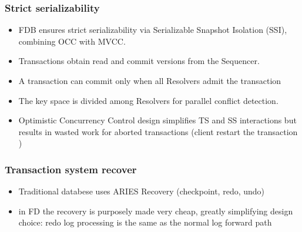 

\begin{frame}
	\frametitle{Strict serializability}
\begin{itemize}
  \item FDB ensures strict serializability via Serializable Snapshot Isolation (SSI), combining OCC with MVCC.
  \item Transactions obtain read and commit versions from the Sequencer.
  \item A transaction can commit only when all Resolvers admit the transaction
  \item The key space is divided among Resolvers for parallel conflict detection.
  \item Optimistic Concurrency Control design simplifies TS and SS interactions but results in wasted work for aborted transactions (client restart the transaction )
\end{itemize}

 \end{frame}







\begin{frame}
	\frametitle{Transaction system recover}
    \begin{itemize}
    
        \item Traditional databese uses ARIES Recovery (checkpoint, redo, undo)
        \item in FD the recovery is purposely made very cheap, greatly simplifying design choice: redo log processing is the same as the normal log forward path
        
\end{itemize}
\end{frame}


